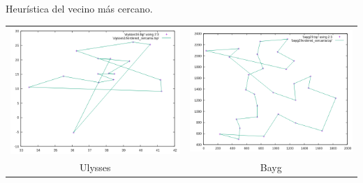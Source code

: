 \documentclass[10pt, xcolor=table]{beamer}
\begin{document}
\begin{frame}[fragile]{Heurística del vecino más cercano. }
\begin{center}
\begin{tabular}{cc}
\includegraphics[scale=0.23]{./Images/ulysses_cercania.png}
&
\includegraphics[scale=0.23]{./Images/bayg_cercania.png} \\
Ulysses & Bayg
\end{tabular}
\end{center}
\begin{center}
\begin{tabular}{c}

\end{tabular}
\end{center}
\end{frame}
\end{document}
